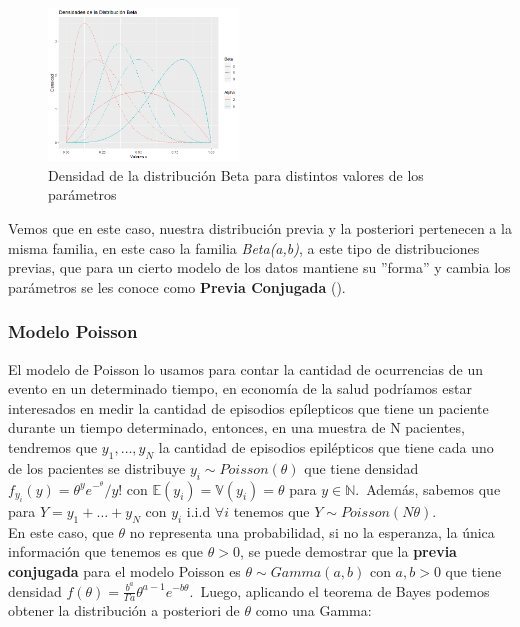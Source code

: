 \documentclass[12pt]{article}
\begin{document}
\begin{figure}[H]
	\centering
	\includegraphics[width=0.45\textwidth]{grafi/dist_beta.jpg}
	\caption{Densidad de la distribución Beta para distintos valores de los parámetros}
	\label{fig:15}
\end{figure}

Vemos que en este caso, nuestra distribución previa y la posteriori pertenecen a la misma familia, en este caso la familia \textit{Beta(a,b)}, a este tipo de distribuciones previas, que para un cierto modelo de los datos mantiene su ''forma'' y cambia los parámetros se les conoce como \textbf{Previa Conjugada} (\cite{hoff_first_2009}).

\subsubsection{Modelo Poisson}

El modelo de Poisson lo usamos para contar la cantidad de ocurrencias de un evento en un determinado tiempo, en economía de la salud podríamos estar interesados en medir la cantidad de episodios epílepticos que tiene un paciente durante un tiempo determinado, entonces, en una muestra de N pacientes, tendremos que $y_1,\ldots,y_N$ la cantidad de episodios epilépticos que tiene cada uno de los pacientes se distribuye $y_i \sim Poisson(\theta)$ que tiene densidad $f_{y_i}(y)=\theta^ye^{-^\theta}/y!$ con $\mathbb{E}(y_i)=\mathbb{V}(y_i)=\theta$ para $y \in \mathbb{N}$.\
Además, sabemos que para $Y=y_1+\ldots+y_N$ con $y_i$ i.i.d $\forall i$ tenemos que $Y\sim Poisson(N\theta)$.\\

En este caso, que $\theta$ no representa una probabilidad, si no la esperanza, la única información que tenemos es que $\theta>0$, se puede demostrar que la \textbf{previa conjugada} para el modelo Poisson es $\theta \sim Gamma(a,b)$ con $a,b>0$ que tiene densidad $f(\theta)=\frac{b^a}{\Gamma{a}}\theta^{a-1}e^{-b\theta}$.\
Luego, aplicando el teorema de Bayes podemos obtener la distribución a posteriori de $\theta$ como una Gamma:\\
\end{document}
